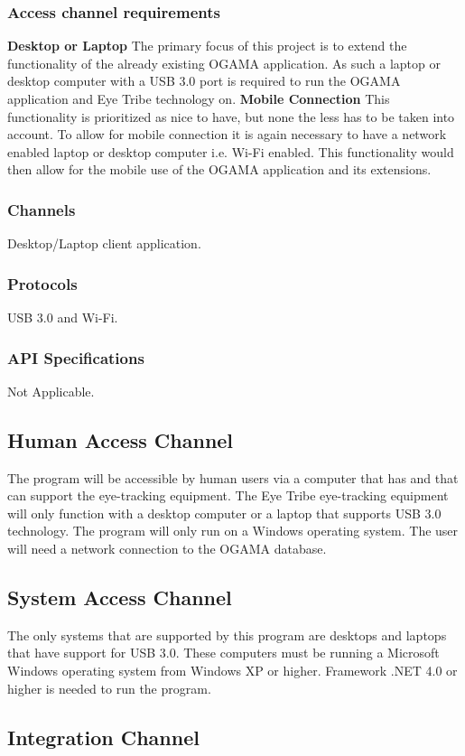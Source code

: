\subsubsection{Access channel requirements}
\textbf{Desktop or Laptop}
\newline
The primary focus of this project is to extend the functionality of the already existing OGAMA application. As such a laptop or desktop computer with a USB 3.0 port is required to run the OGAMA application and Eye Tribe technology on.
\newline
\textbf{Mobile Connection}
\newline
 This functionality is prioritized as nice to have, but none the less has to be taken into account. To allow for mobile connection it is again necessary to have a network enabled laptop or desktop computer i.e. Wi-Fi enabled. This functionality would then allow for the mobile use of the OGAMA application and its extensions.\newline 

\subsubsection{Channels}
Desktop/Laptop client application.
\subsubsection{Protocols}
USB 3.0 and Wi-Fi.
\subsubsection{API Specifications}
Not Applicable.

\subsection{Human Access Channel}
    The program will be accessible by human users via a computer that has and that can support the eye-tracking equipment. The Eye Tribe eye-tracking equipment will only function with a desktop computer or a laptop that supports USB 3.0 technology. The program will only run on a Windows operating system. The user will need a network connection to the OGAMA database.
\subsection{System Access Channel}
    The only systems that are supported by this program are desktops and laptops that have support for USB 3.0. These computers must be running a Microsoft Windows operating system from Windows XP or higher. Framework .NET 4.0 or higher is needed to run the program.
\subsection{Integration Channel}
